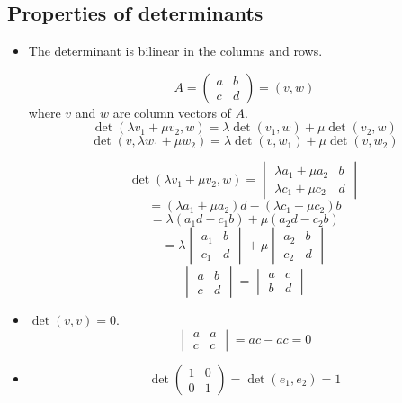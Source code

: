 \documentclass[a4paper,landscape,twocolumn]{article}
\begin{document}
\subsection{Properties of determinants}
%
\begin{itemize}
  \item The determinant is bilinear in the columns and rows.

    \[ A = \begin{pmatrix} a & b \\ c & d \end{pmatrix} = (v,w) \]
    where $v$ and $w$ are column vectors of $A$.
    \[ \det(\lambda v_1 + \mu v_2, w) = \lambda \det(v_1, w) + \mu \det(v_2, w) \]
    \[ \det(v, \lambda w_1 + \mu w_2) = \lambda \det(v, w_1) + \mu \det(v, w_2) \]

    \[
      \det(\lambda v_1 + \mu v_2, w) =
      \begin{vmatrix}
        \lambda a_1 + \mu a_2 & b \\
        \lambda c_1 + \mu c_2 & d
      \end{vmatrix}
    \] \[
      = (\lambda a_1 + \mu a_2) d - (\lambda c_1 + \mu c_2) b
    \] \[
      = \lambda (a_1 d - c_1 b) + \mu (a_2 d - c_2 b)
    \] \[
      = \lambda \begin{vmatrix} a_1 & b \\ c_1 & d \end{vmatrix}
      + \mu \begin{vmatrix} a_2 & b \\ c_2 & d \end{vmatrix}
    \]
    \[ \begin{vmatrix} a & b \\ c & d \end{vmatrix} = \begin{vmatrix} a & c \\ b & d \end{vmatrix} \]
  \item
    $\det(v,v) = 0$.
    \[ \begin{vmatrix} a & a \\ c & c \end{vmatrix} = ac - ac = 0 \]
  \item
    \[ \det\begin{pmatrix} 1 & 0 \\ 0 & 1 \end{pmatrix} = \det(e_1, e_2) = 1 \]
\end{itemize}
\end{document}
